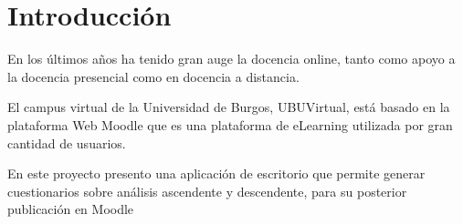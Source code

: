
\section{Introducción}
En los últimos años ha tenido gran auge la docencia online, tanto como apoyo a la docencia presencial como en docencia a distancia.

El campus virtual de la Universidad de Burgos,  UBUVirtual,  está basado en la  plataforma Web  Moodle que es  una plataforma de eLearning utilizada por gran cantidad de usuarios.

En este proyecto presento una aplicación de escritorio que permite generar cuestionarios sobre análisis ascendente y descendente,  para su posterior publicación en Moodle 










